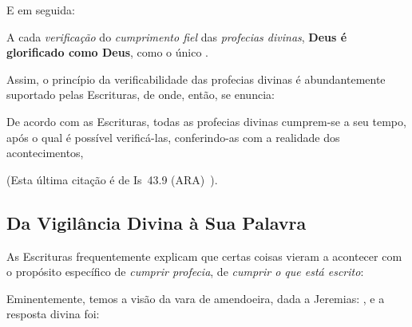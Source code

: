     E em seguida:


    A cada \emph{verificação} do \emph{cumprimento fiel} das \emph{profecias divinas}, \textbf{Deus é  glorificado  como  Deus},
    como o único .

    Assim, o princípio da verificabilidade das profecias divinas é abundantemente suportado pelas Escrituras, de onde, então, se
    enuncia:

    \begin{PRI}
        \label{pri.verificabilidade}
        De acordo com as Escrituras, todas as profecias divinas cum\-prem-se a seu tempo, após  o  qual  é  possível
        verificá-las, conferindo-as com a realidade dos acontecimentos, 
    \end{PRI}

    (Esta última citação é de Is~43.9 (ARA)~\cite{ARA}).


    \subsection{Da Vigilância Divina à Sua Palavra}

    As Escrituras frequentemente explicam que certas coisas vieram a acontecer  com  o  propósito  específico  de  \emph{cumprir
    profecia}, de \emph{cumprir o que está escrito}:


    Eminentemente, temos a visão da vara de amendoeira, dada a Jeremias: , e a resposta divina foi:


